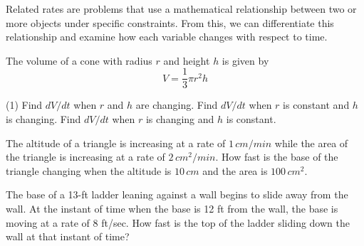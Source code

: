 \documentclass[../mathNotesPreamble]{subfiles}
\providecommand{\relscalefact}{1.4}
\begin{document}
  \begin{thmBox*}
    Related rates are problems that use a mathematical relationship between two or more objects under specific constraints. From this, we can differentiate this relationship and examine how each variable changes with respect to time.
  \end{thmBox*}

  The volume of a cone with radius $r$ and height $h$ is given by
    \[V=\frac{1}{3}\pi r^2h\]
  \begin{extasks}[after-item-skip=\stretch{1}](1)
    \task Find $dV/dt$ when $r$ and $h$ are changing.
    \task Find $dV/dt$ when $r$ is constant and $h$ is changing.
    \task Find $dV/dt$ when $r$ is changing and $h$ is constant.
  \end{extasks}
  \pagebreak

  \begin{ex*}
    The altitude of a triangle is increasing at a rate of $1\,cm/min$ while the area of the triangle is increasing at a rate of $2\,cm^2/min$. How fast is the base of the triangle changing when the altitude is $10\,cm$ and the area is $100\,cm^2$.
  \end{ex*}
  \begin{flushright}
  \end{flushright}
  \pagebreak

  \begin{ex*}
    The base of a 13-ft ladder leaning against a wall begins to slide away from the wall. At the instant of time when the base is 12 ft from the wall, the base is moving at a rate of 8 ft/sec. How fast is the top of the ladder sliding down the wall at that instant of time?
  \end{ex*}
  \pagebreak
\end{document}
